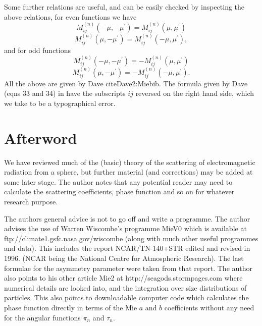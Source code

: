 \documentclass[12pt]{article}
\begin{document}
Some further relations are useful, and can be easily checked by inspecting
the above relations, for even functions we have
\begin{equation}
M_{ij}^{(n)}(-\mu, -\mu^\prime)= M_{ij}^{(n)}(\mu, \mu^\prime)
\end{equation}
\begin{equation}
M_{ij}^{(n)}(\mu, -\mu^\prime)= M_{ij}^{(n)}(-\mu, \mu^\prime),
\end{equation}
and for odd functions 
\begin{equation}
M_{ij}^{(n)}(-\mu, -\mu^\prime)=-M_{ij}^{(n)}(\mu, \mu^\prime)
\end{equation}
\begin{equation}
M_{ij}^{(n)}(\mu, -\mu^\prime)= -M_{ij}^{(n)}(-\mu, \mu^\prime).
\end{equation}
All the above are given by Dave \cite{Dave1:Miebib} cite{Dave2:Miebib}.
The formula given by Dave (eqns 33 and 34) in \cite{Dave2:Miebib} have the subscripts $ij$ reversed
on the right hand side, which we take to be a typographical error. 


\section{Afterword}
We have reviewed much of the (basic) theory of the scattering of electromagnetic radiation from a 
sphere, but further material (and corrections) may be added at some later stage. The author 
notes that any potential reader may need to calculate the scattering coefficients, 
phase function and so on for whatever research purpose. 

The authors general advice is not to go off and write a programme. The author 
advises the use of Warren Wiscombe's programme MieV0 
which is  available at
\newline
 ftp://climate1.gsfc.nasa.gov/wiscombe  
(along with much other useful programmes and data). 
This includes the report NCAR/TN-140+STR
edited and revised in 1996. (NCAR being the National Centre for Atmospheric Research). 
The last formulae for the asymmetry parameter were taken from that report.
The author also points to his other article Mie2 at
 http://seagods.stormpages.com 
where numerical details are looked into, and the integration over size distributions of particles.
This also points to downloadable computer code which calculates the phase function 
directly in terms of the Mie $a$ and $b$ coefficients without any need for the angular functions
$\pi_n$ and $\tau_n$.

%
\printbibliography
\end{document}
